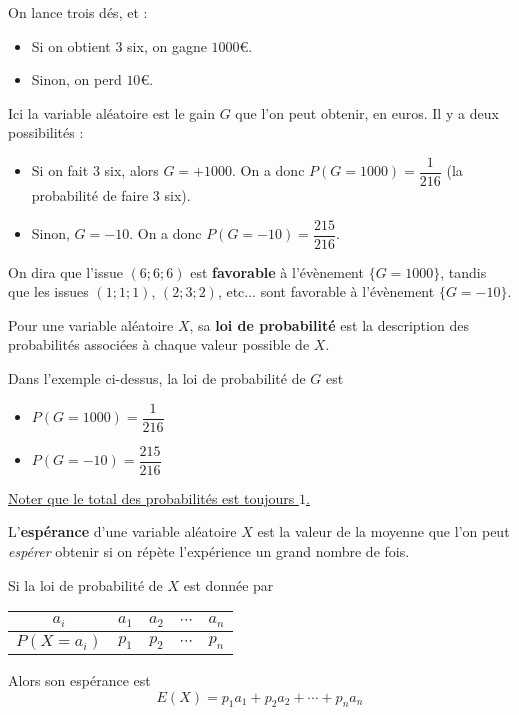 \documentclass[
	classe=$1^{ere}STI2D$
]{coursclass}
\begin{document}
\begin{exemple}
	On lance trois dés, et :
	\begin{itemize}
		\item Si on obtient $3$ six, on gagne $1000$€.
		\item Sinon, on perd $10$€.
	\end{itemize}
	Ici la variable aléatoire est le gain $G$ que l'on peut obtenir, en euros. Il y a deux possibilités :
	\begin{itemize}
		\item Si on fait $3$ six, alors $G = +1000$. On a donc $P(G = 1000) = \dfrac{1}{216}$ (la probabilité de faire $3$ six).
		\item Sinon, $G = -10$. On a donc $P(G = -10) = \dfrac{215}{216}$.
	\end{itemize}

	On dira que l'issue $(6 ; 6 ; 6)$ est \textbf{favorable} à l'évènement $\{G = 1000\}$, tandis que les issues $(1 ; 1 ; 1)$, $(2 ; 3 ; 2)$, etc... sont favorable à l'évènement $\{G = -10\}$.
\end{exemple}

\begin{definition}
	Pour une variable aléatoire $X$, sa \textbf{loi de probabilité} est la description des probabilités associées à chaque valeur possible de $X$.
\end{definition}

\begin{exemple}
	Dans l'exemple ci-dessus, la loi de probabilité de $G$ est
	\begin{itemize}
		\item $P(G = 1000) = \dfrac{1}{216}$
		\item $P(G = -10) = \dfrac{215}{216}$
	\end{itemize}

	\uline{Noter que le total des probabilités est toujours $1$.}
\end{exemple}

\begin{definition}[Espérance]
	L'\textbf{espérance} d'une variable aléatoire $X$ est la valeur de la moyenne que l'on peut \textit{espérer} obtenir si on répète l'expérience un grand nombre de fois.

	Si la loi de probabilité de $X$ est donnée par
	\begin{center}
		\begin{tabular}{|c|c|c|c|c|}
			\hline
			$a_i$        & $a_1$ & $a_2$ & $⋯$ & $a_n$ \\ \hline
			$P(X = a_i)$ & $p_1$ & $p_2$ & $⋯$ & $p_n$ \\ \hline
		\end{tabular}
	\end{center}

	Alors son espérance est
	$$ E(X) = p_1a_1 + p_2a_2 + ⋯ + p_na_n $$
\end{definition}
\end{document}

